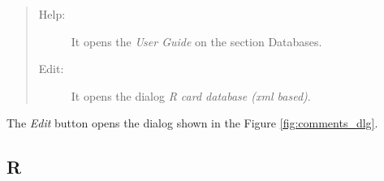 \begin{quote}
  \begin{footnotesize}
    \begin{description}
      \item[Help:]
        It opens the \textit{User Guide} on the section Databases.
      \item[Edit:]
        It opens the dialog \textit{R card database (xml based)}.
    \end{description}
  \end{footnotesize}
\end{quote}

The \textit{Edit} button opens the dialog shown in the Figure \ref{fig:comments_dlg}.


\hypertarget{working_tools_r}{}
\subsection{R}


